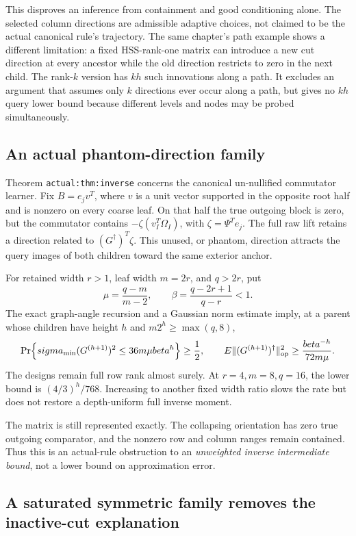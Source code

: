 \documentclass[11pt,oneside,openany,a4paper]{report}
\numberwithin{equation}{chapter}
\theoremstyle{definition}
\theoremstyle{remark}
\begin{document}
This disproves an inference from containment and good conditioning
alone.  The selected column directions are admissible adaptive
choices, not claimed to be the actual canonical rule's trajectory.
The same chapter's path example shows a different limitation: a
fixed HSS-rank-one matrix can introduce a new cut direction at every
ancestor while the old direction restricts to zero in the next
child.  The rank-$k$ version has $kh$ such innovations along a path.
It excludes an argument that assumes only $k$ directions ever occur
along a path, but gives no $kh$ query lower bound because different
levels and nodes may be probed simultaneously.

\subsection{An actual phantom-direction family}

Theorem \texttt{actual:thm:inverse} concerns the canonical
un-nullified commutator learner.  Fix $B=e_jv^T$, where $v$ is a unit
vector supported in the opposite root half and is nonzero on every
coarse leaf.  On that half the true outgoing block is zero, but the
commutator contains
$-\zeta(v_I^T\Omega_I)$, with $\zeta=\Psi^Te_j$.
The full raw lift retains a direction related to
$(G^\dagger)^T\zeta$.  This unused, or phantom, direction attracts the
query images of both children toward the same exterior anchor.

For retained width $r>1$, leaf width $m=2r$, and $q>2r$, put
\[
 \mu=\frac{q-m}{m-2},\qquad
 \beta=\frac{q-2r+1}{q-r}<1.
\]
The exact graph-angle recursion and a Gaussian norm estimate imply,
at a parent whose children have height $h$ and
$m2^h\ge\max(q,8)$,
\[
 \Pr\!\left\{\sigma_{\min}(G^{(h+1)})^2
                   \le36m\mu\beta^h\right\}\ge\frac12,\qquad
 \mathbb E\|(G^{(h+1)})^\dagger\|_{\rm op}^2
                   \ge\frac{\beta^{-h}}{72m\mu}.
\]
The designs remain full row rank almost surely.  At $r=4,m=8,q=16$,
the lower bound is $(4/3)^h/768$.  Increasing to another fixed width
ratio slows the rate but does not restore a depth-uniform full
inverse moment.

The matrix is still represented exactly.  The collapsing orientation
has zero true outgoing comparator, and the nonzero row and column
ranges remain contained.  Thus this is an actual-rule obstruction to
an \emph{unweighted inverse intermediate bound}, not a lower bound
on approximation error.

\subsection{A saturated symmetric family removes the inactive-cut explanation}
\end{document}
